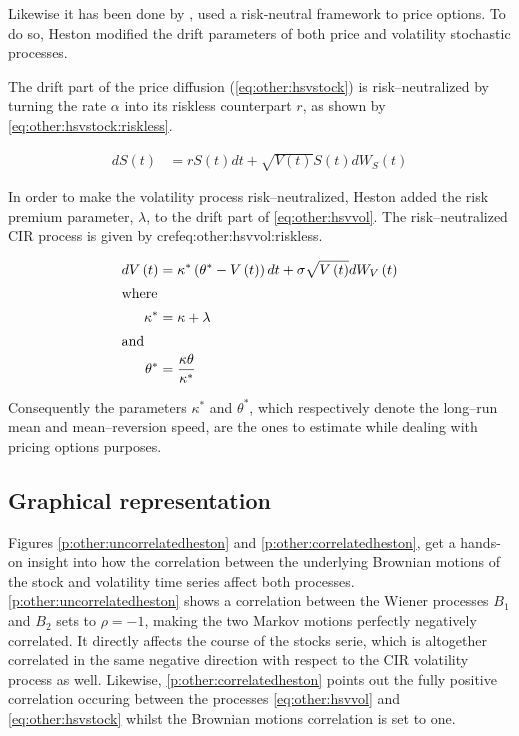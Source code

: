 \documentclass[12pt]{report}
\newcommand{\Bmsub}[1]{W_{#1}\left(t\right)}
\newcommand{\St}{S\left(t\right)}
\newcommand{\Vt}{V\left(t\right)}
\newcommand{\HSVstockriskless}{
  d\St &= r \St dt + \sqrt{\Vt} \St d \Bmsub{S}
}
\newcommand{\HSVvolriskless}{
  d\Vt &= \kappa^{*} \left(\theta^{*} - \Vt \right) dt + \sigma \sqrt{\Vt} d \Bmsub{V}
}
\begin{document}
Likewise it has been done by \citet{bs}, \citet{heston1993} used a risk-neutral framework to price options.
To do so, Heston modified the drift parameters of both price and volatility stochastic processes.

The drift part of the price diffusion (\cref{eq:other:hsvstock}) is risk--neutralized by turning the rate $\alpha$ into its riskless counterpart $r$, as shown by \cref{eq:other:hsvstock:riskless}.

\begin{align}
    \HSVstockriskless \label{eq:other:hsvstock:riskless}
\end{align}

In order to make the volatility process risk--neutralized, Heston added the risk premium parameter, $\lambda$, to the drift part of \cref{eq:other:hsvvol}. The risk--neutralized CIR process is given by cref{eq:other:hsvvol:riskless}.

\begin{align}
    \HSVvolriskless \label{eq:other:hsvvol:riskless} \\
    \intertext{where}
    \kappa^{*} & = \kappa + \lambda \\
    \intertext{and}
    \theta^{*} & = \frac{\kappa \theta}{\kappa^{*}}
\end{align}

Consequently the parameters $\kappa^{*}$ and $\theta^{*}$, which respectively denote the long--run mean and mean--reversion speed, are the ones to estimate while dealing with pricing options purposes. 

\subsection{Graphical representation}
\label{sub:other:heston:graphical}   

Figures \ref{p:other:uncorrelatedheston} and \ref{p:other:correlatedheston}, get a hands-on insight into how the correlation between the underlying Brownian motions of the stock and volatility time series affect both processes.
\cref{p:other:uncorrelatedheston} shows a correlation between the Wiener processes $B_1$ and $B_2$ sets to $\rho = -1$, making the two Markov motions perfectly negatively correlated. 
It directly affects the course of the stocks serie, which is altogether correlated in the same negative direction with respect to the CIR volatility process as well.
Likewise, \cref{p:other:correlatedheston} points out the fully positive correlation occuring between the processes \ref{eq:other:hsvvol} and \ref{eq:other:hsvstock} whilst the Brownian motions correlation is set to one. 
\end{document}
